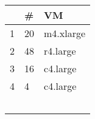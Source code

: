 {\scriptsize
\begin{tabular}{@{}lll@{}}
\toprule
     & \#      & VM         \\ \midrule
1    & 20     & m4.xlarge  \\
2    & 48     & r4.large   \\
3    & 16     & c4.large   \\
4    & 4      & c4.large \\
     &        &            \\
     &        &            \\
     &        &            \\
     &        &            \\
     &        &            \\ \bottomrule
\end{tabular}
}

